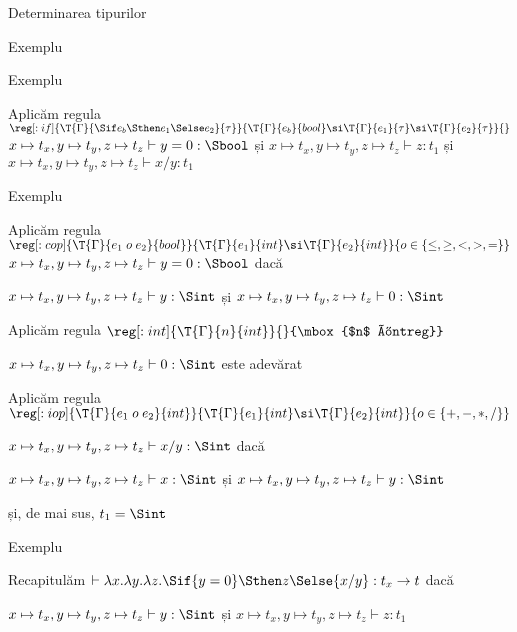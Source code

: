 \documentclass[xcolor=x11names,compress,10pt]{beamer}
\begin{document}
\begin{section}{Determinarea tipurilor}
\begin{subsection}{Exemplu}
\begin{frame}{Exemplu}
\begin{block}{Aplicăm regula 
    $\reg[:if]{\T{\Gamma}{\Sif e_b \Sthen e_1 \Selse e_2}{\tau}}{\T{\Gamma}{e_b}{bool} \si \T{\Gamma}{e_1}{\tau} \si \T{\Gamma}{e_2}{\tau}}{}$
    }
        $x \mapsto t_x, y\mapsto t_y, z \mapsto t_z \vdash {y = 0} : \Sbool$ și
        $x \mapsto t_x, y\mapsto t_y, z \mapsto t_z \vdash {z} : t_1$ și
        $x \mapsto t_x, y\mapsto t_y, z \mapsto t_z \vdash {x / y} : t_1$


        \end{block}
      \end{frame}
      \begin{frame}{Exemplu}
        \begin{block}{Aplicăm regula 
    $\reg[:cop]{\T{\Gamma}{e_1\mathrel{o} e_2}{bool}}{\T{\Gamma}{e_1}{int} \si \T{\Gamma}{e_2}{int}}{o\in \{\leq, \geq, <, >, =\}}$
        }
        $x \mapsto t_x, y\mapsto t_y, z \mapsto t_z \vdash {y = 0} : \Sbool$ dacă

        $x \mapsto t_x, y\mapsto t_y, z \mapsto t_z \vdash y : \Sint$ \hfill și \hfill
        $x \mapsto t_x, y\mapsto t_y, z \mapsto t_z \vdash 0 : \Sint$
        \end{block}

        \begin{block}{Aplicăm regula 
     $\reg[:int]{\T{\Gamma}{n}{int}}{}{\mbox{$n$ întreg}}$
        }

        $x \mapsto t_x, y\mapsto t_y, z \mapsto t_z \vdash 0 : \Sint$ este adevărat
        \end{block}

        \begin{block}{Aplicăm regula 
    $\reg[:iop]{\T{\Gamma}{e_1\mathrel{o} e_2}{int}}{\T{\Gamma}{e_1}{int} \si \T{\Gamma}{e_2}{int}}{o\in \{+,-,*,/\}}$
        }

        $x \mapsto t_x, y\mapsto t_y, z \mapsto t_z \vdash {x / y} : \Sint$ dacă

        $x \mapsto t_x, y\mapsto t_y, z \mapsto t_z \vdash x : \Sint$ \hfill și \hfill
        $x \mapsto t_x, y\mapsto t_y, z \mapsto t_z \vdash y : \Sint$

        și, de mai sus, $t_1 = \Sint$
        \end{block}
        
      \end{frame}

      \begin{frame}{Exemplu}
      \begin{block}{Recapitulăm}
        $\vdash  \lambda x.\lambda y. \lambda z. \Sif {y = 0} \Sthen z \Selse {x / y} : t_x \rightarrow t$ dacă

        $x \mapsto t_x, y\mapsto t_y, z \mapsto t_z \vdash y : \Sint$ \hfill și \hfill
        $x \mapsto t_x, y\mapsto t_y, z \mapsto t_z \vdash {z} : t_1$


\end{block}
\end{frame}
\end{subsection}
\end{section}
\end{document}
